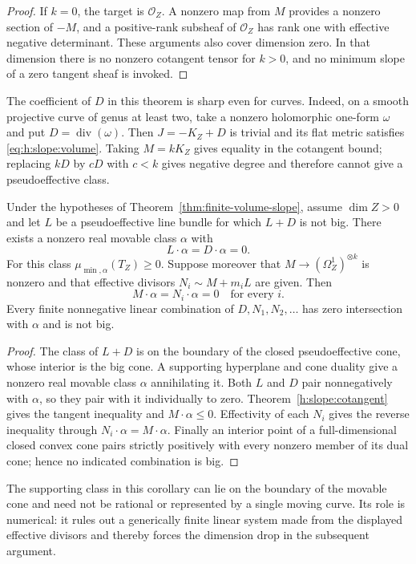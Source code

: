 \begin{proof}
If $k=0$, the target is $\mathcal O_Z$.  A nonzero map from $M$
provides a nonzero section of $-M$, and a positive-rank subsheaf of
$\mathcal O_Z$ has rank one with effective negative determinant.
These arguments also cover dimension zero.  In that dimension there
is no nonzero cotangent tensor for $k>0$, and no minimum slope of a
zero tangent sheaf is invoked.
\end{proof}

The coefficient of $D$ in this theorem is sharp even for curves.
Indeed, on a smooth projective curve of genus at least two, take a
nonzero holomorphic one-form $\omega$ and put $D=\operatorname{div}(\omega)$.
Then $J=-K_Z+D$ is trivial and its flat metric satisfies
\eqref{eq:h:slope:volume}.  Taking $M=kK_Z$ gives equality in the
cotangent bound; replacing $kD$ by $cD$ with $c<k$ gives negative
degree and therefore cannot give a pseudoeffective class.

\begin{corollary}
\label{h:slope:face}
Under the hypotheses of Theorem~\ref{thm:finite-volume-slope},
assume $\dim Z>0$ and let $L$ be a pseudoeffective line bundle for
which $L+D$ is not big.  There exists a nonzero real movable class
$\alpha$ with
\[
                       L\cdot\alpha=D\cdot\alpha=0.
\]
For this class $\mu_{\min,\alpha}(T_Z)\geq0$.  Suppose moreover that
$M\to(\Omega_Z^1)^{\otimes k}$ is nonzero and that effective divisors
$N_i\sim M+m_iL$ are given.  Then
\[
                  M\cdot\alpha=N_i\cdot\alpha=0
                         \quad\text{for every }i.
\]
Every finite nonnegative linear combination of $D,N_1,N_2,\ldots$
has zero intersection with $\alpha$ and is not big.
\end{corollary}

\begin{proof}
The class of $L+D$ is on the boundary of the closed pseudoeffective
cone, whose interior is the big cone.  A supporting hyperplane and
cone duality give a nonzero real movable class $\alpha$ annihilating
it.  Both $L$ and $D$ pair nonnegatively with $\alpha$, so they pair
with it individually to zero.  Theorem~\ref{h:slope:cotangent} gives
the tangent inequality and $M\cdot\alpha\leq0$.  Effectivity of each
$N_i$ gives the reverse inequality through
$N_i\cdot\alpha=M\cdot\alpha$.  Finally an interior point of a
full-dimensional closed convex cone pairs strictly positively with
every nonzero member of its dual cone; hence no indicated combination
is big.
\end{proof}

The supporting class in this corollary can lie on the boundary of the
movable cone and need not be rational or represented by a single
moving curve.  Its role is numerical: it rules out a generically
finite linear system made from the displayed effective divisors and
thereby forces the dimension drop in the subsequent argument.
